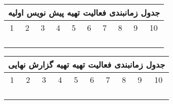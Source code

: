 \documentclass{report}
\begin{document}
\begin{center}
\begin{tabular}{ |c|c|c|c|c|c|c|c|c|c|}
\hline
\multicolumn{10}{|c|}{جدول زمانبندی فعالیت تهیه پیش نویس اولیه } \\
\hline
1&2&3&4&5&6&7&8&9&10\\
\hline
 &  & &  & &  &  &\cellcolor{black!100} &  & \\
\hline
 &  & &  &  &  &  & \cellcolor{black!100} & & \\
\hline
 & &  &  &  &  & \cellcolor{black!100} & \cellcolor{black!100} & & \\
\hline
 &  &  &  &  &  & \cellcolor{black!100} & \cellcolor{black!100} & &  \\
\hline
\end{tabular}
\end{center}

\begin{center}
\begin{tabular}{ |c|c|c|c|c|c|c|c|c|c|}
\hline
\multicolumn{10}{|c|}{جدول زمانبندی فعالیت تهیه تهیه گزارش نهایی } \\
\hline
1&2&3&4&5&6&7&8&9&10\\
\hline
 &  & &  & &  &  & & \cellcolor{black!100} & \\
\hline
 &  & &  &  &  &  &  & \cellcolor{black!100}& \cellcolor{black!100} \\
\hline
 & &  &  &  &  &  &  & \cellcolor{black!100} & \cellcolor{black!100}  \\
\hline
 &  &  &  &  &  & &  & \cellcolor{black!100} & \cellcolor{black!100}  \\
\hline
\end{tabular}
\end{center}
\end{document}

